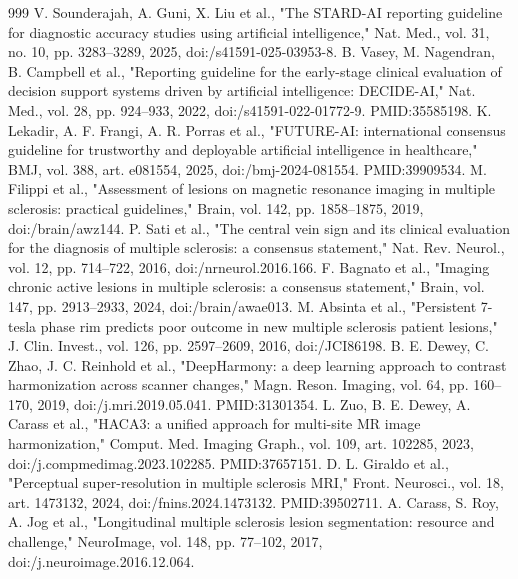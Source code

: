 \documentclass[journal,twoside,web]{ieeecolor}
\begin{document}
\begin{thebibliography}{999}
 V. Sounderajah, A. Guni, X. Liu et al., "The STARD-AI reporting guideline for diagnostic accuracy studies using artificial intelligence," Nat. Med., vol. 31, no. 10, pp. 3283--3289, 2025, doi:/\allowbreak s41591-025-03953-8.
 B. Vasey, M. Nagendran, B. Campbell et al., "Reporting guideline for the early-stage clinical evaluation of decision support systems driven by artificial intelligence: DECIDE-AI," Nat. Med., vol. 28, pp. 924--933, 2022, doi:/\allowbreak s41591-022-01772-9. PMID:35585198.
 K. Lekadir, A. F. Frangi, A. R. Porras et al., "FUTURE-AI: international consensus guideline for trustworthy and deployable artificial intelligence in healthcare," BMJ, vol. 388, art. e081554, 2025, doi:/\allowbreak bmj-2024-081554. PMID:39909534.
 M. Filippi et al., "Assessment of lesions on magnetic resonance imaging in multiple sclerosis: practical guidelines," Brain, vol. 142, pp. 1858--1875, 2019, doi:/\allowbreak brain/\allowbreak awz144.
 P. Sati et al., "The central vein sign and its clinical evaluation for the diagnosis of multiple sclerosis: a consensus statement," Nat. Rev. Neurol., vol. 12, pp. 714--722, 2016, doi:/\allowbreak nrneurol.2016.166.
 F. Bagnato et al., "Imaging chronic active lesions in multiple sclerosis: a consensus statement," Brain, vol. 147, pp. 2913--2933, 2024, doi:/\allowbreak brain/\allowbreak awae013.
 M. Absinta et al., "Persistent 7-tesla phase rim predicts poor outcome in new multiple sclerosis patient lesions," J. Clin. Invest., vol. 126, pp. 2597--2609, 2016, doi:/\allowbreak JCI86198.
 B. E. Dewey, C. Zhao, J. C. Reinhold et al., "DeepHarmony: a deep learning approach to contrast harmonization across scanner changes," Magn. Reson. Imaging, vol. 64, pp. 160--170, 2019, doi:/\allowbreak j.mri.2019.05.041. PMID:31301354.
 L. Zuo, B. E. Dewey, A. Carass et al., "HACA3: a unified approach for multi-site MR image harmonization," Comput. Med. Imaging Graph., vol. 109, art. 102285, 2023, doi:/\allowbreak j.compmedimag.2023.102285. PMID:37657151.
 D. L. Giraldo et al., "Perceptual super-resolution in multiple sclerosis MRI," Front. Neurosci., vol. 18, art. 1473132, 2024, doi:/\allowbreak fnins.2024.1473132. PMID:39502711.
 A. Carass, S. Roy, A. Jog et al., "Longitudinal multiple sclerosis lesion segmentation: resource and challenge," NeuroImage, vol. 148, pp. 77--102, 2017, doi:/\allowbreak j.neuroimage.2016.12.064.

\end{thebibliography}
\end{document}

